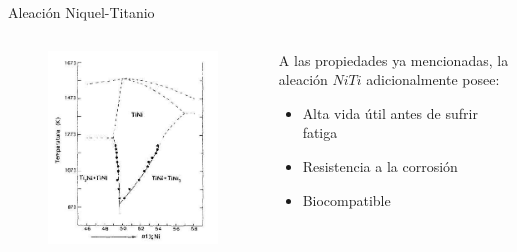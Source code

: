 \documentclass[11pt]{beamer}
\begin{document}
		\begin{frame}{Aleación Niquel-Titanio}
			\begin{columns}[T]
				\begin{column}{.49\textwidth}
					\begin{figure}[H]
					\centering
					\includegraphics[scale=0.35]{img/DiagramaNiTi.jpg}
					\end{figure}
				\end{column}
				\begin{column}{.49\textwidth}
				A las propiedades ya mencionadas, la aleación $NiTi$ adicionalmente posee:
					\begin{itemize}
						\item Alta vida útil antes de sufrir fatiga
						\item Resistencia a la corrosión
						\item Biocompatible
					\end{itemize}
				\end{column}
			\end{columns}
		\end{frame}
		
		\begin{frame}
		\end{frame}
		
\end{document}
